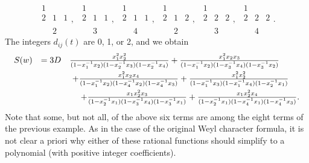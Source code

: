 $$
\begin{array}{ccc}
1 &   &   \\
2 & 1 & 1 \\
  &   &   \\
  & 2 &
\end{array},
\ \
\begin{array}{ccc}
1 &   &   \\
2 & 1 & 1 \\
  &   &   \\
  & 3 &
\end{array},
\ \
\begin{array}{ccc}
1 &   &   \\
2 & 1 & 1 \\
  &   &   \\
  & 4 &
\end{array},
\ \
\begin{array}{ccc}
1 &   &   \\
2 & 1 & 2 \\
  &   &   \\
  & 2 &
\end{array},
\ \
\begin{array}{ccc}
1 &   &   \\
2 & 2 & 2 \\
  &   &   \\
  & 3 &
\end{array},
\ \
\begin{array}{ccc}
1 &   &   \\
2 & 2 & 2 \\
  &   &   \\
  & 4 &
\end{array}.
$$
The integers $d_{ij}(t)$ are 0, 1, or 2,
and we obtain
$$
\begin{array}{rcl}
S(w) & =3D &
{ x_1^2 x_2^2
\over
(1 - x_1^{-1} x_2) (1 - x_2^{-1} x_3) (1 - x_2^{-1} x_4)  }
+
%
{ x_1^2 x_2 x_3
\over
(1 - x_1^{-1} x_2) (1 - x_3^{-1} x_4) (1 - x_3^{-1} x_2)  }
\\[.7em]
& & \ +
%
{ x_1^2 x_2 x_4
\over
(1 - x_1^{-1} x_2) (1 - x_4^{-1} x_2) (1 - x_4^{-1} x_3)  }
+
%
{ x_1^2 x_2^2
\over
(1 - x_1^{-1} x_3) (1 - x_1^{-1} x_4) (1 - x_2^{-1} x_1)  }
\\[.7em]
& & \ \ \ \ +
%
{ x_1 x_2^2 x_3
\over
(1 - x_2^{-1} x_1) (1 - x_3^{-1} x_4) (1 - x_3^{-1} x_1)  }
+
%
{ x_1 x_2^2 x_4
\over
(1 - x_2^{-1} x_1) (1 - x_4^{-1} x_1) (1 - x_4^{-1} x_3)  } .
\end{array}
$$
Note that some, but not all, of the above six terms are
among the eight terms of the previous example.
As in the case of
the original Weyl character formula,
it is not clear a priori why either of these rational functions
should simplify to a polynomial (with positive integer coefficients).

